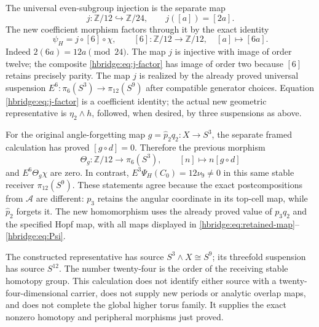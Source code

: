 \documentclass[11pt,letterpaper]{article}
\numberwithin{equation}{section}
\theoremstyle{definition}
\theoremstyle{remark}
\begin{document}
The universal even-subgroup injection is the separate map
\[
j:\mathbb Z/12\hookrightarrow\mathbb Z/24,
\qquad j([a])=[2a].
\]
The new coefficient morphism factors through it by the exact
identity
\begin{equation}
\psi_H=j\circ[6]\circ\chi,
\qquad [6]:\mathbb Z/12\longrightarrow\mathbb Z/12,
\quad [a]\longmapsto[6a].
\label{hbridge:eq:j-factor}
\end{equation}
Indeed \(2(6a)=12a\pmod{24}\). The map \(j\) is
injective with image of order twelve; the composite
\eqref{hbridge:eq:j-factor} has image of order two because
\([6]\) retains precisely parity. The map \(j\) is realized
by the already proved universal suspension
\(E^6:\pi_6(S^3)\to\pi_{12}(S^9)\) after compatible
generator choices. Equation \eqref{hbridge:eq:j-factor} is a
coefficient identity; the actual new geometric representative is
\(\eta_2\wedge h\), followed, when desired, by three
suspensions as above.

For the original angle-forgetting map
\(g=\widehat p_2q_2:X\to S^3\), the separate framed
calculation has proved \([g\circ d]=0\). Therefore the
previous morphism
\[
\Theta_g:\mathbb Z/12\longrightarrow\pi_6(S^3),
\qquad [n]\longmapsto n[g\circ d]
\]
and \(E^6\Theta_g\chi\) are zero. In contrast,
\(E^3\Psi_H(C_0)=12\nu_9\ne0\) in this same stable
receiver \(\pi_{12}(S^9)\). These statements agree because
the exact postcompositions from \(\mathcal A\) are different:
\(p_3\) retains the angular coordinate in its top-cell map,
while \(\widehat p_2\) forgets it. The new homomorphism
uses the already proved value of \(p_3q_2\) and the specified
Hopf map, with all maps displayed in
\eqref{hbridge:eq:retained-map}--\eqref{hbridge:eq:Psi}.

The constructed representative has source \(S^3\wedge X\cong
S^9\); its threefold suspension has source \(S^{12}\).
The number twenty-four is the order of the receiving stable
homotopy group. This calculation does not identify either source
with a twenty-four-dimensional carrier, does not supply new
periods or analytic overlap maps, and does not complete the
global higher torus family. It supplies the exact nonzero
homotopy and peripheral morphisms just proved.
\end{document}
